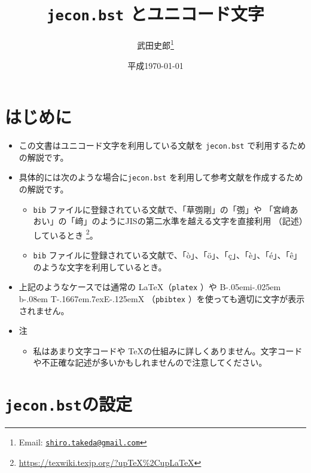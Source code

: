 \documentclass[10pt]{bxjsarticle}
\title{\textbf{\texttt{jecon.bst} とユニコード文字}}
\author{武田史郎\thanks{Email: \texttt{\href{mailto:shiro.takeda@gmail.com}{shiro.takeda@gmail.com}}}}
\date{平成\today}
\def\BibTeX{{\rm B\kern-.05em{\sc i\kern-.025em b}\kern-.08em
    T\kern-.1667em\lower.7ex\hbox{E}\kern-.125emX}}
\begin{document}
\maketitle

\tableofcontents


\section{はじめに}

\begin{itemize}
 \item この文書はユニコード文字を利用している文献を \texttt{jecon.bst}  で利用するための解説です。
 \item 具体的には次のような場合に\texttt{jecon.bst}  を利用して参考文献を作成するための解説です。
       \begin{itemize}
	\item \texttt{bib}  ファイルに登録されている文献で、「草彅剛」の「彅」や
	      「宮﨑あおい」の「﨑」のようにJISの第二水準を越える文字を直接利用
	      （記述）しているとき
	      \footnote{\url{https://texwiki.texjp.org/?upTeX\%2CupLaTeX}}。
	\item \texttt{bib}  ファイルに登録されている文献で、「ò」、「ö」、「ç」、「è」、「é」、「ê」のような文字を利用しているとき。 
       \end{itemize}
 \item 上記のようなケースでは通常の \LaTeX （\texttt{platex} ）や \BibTeX
       （\texttt{pbibtex} ）を使っても適切に文字が表示されません。
 \item 注
       \begin{itemize}
	\item 私はあまり文字コードや \TeX の仕組みに詳しくありません。文字コード
	      や不正確な記述が多いかもしれませんので注意してください。
       \end{itemize}
       
\end{itemize}

\section{\texttt{jecon.bst}の設定}
\end{document}
